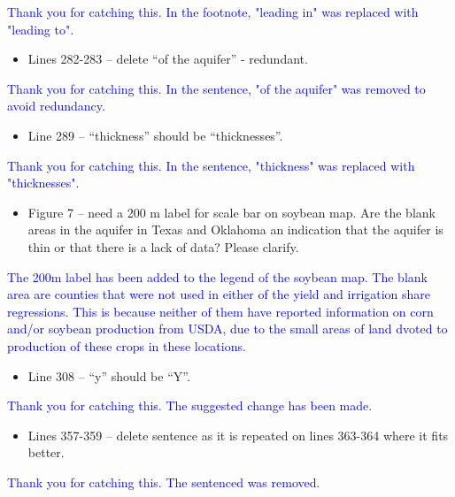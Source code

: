\documentclass[
]{article}
\providecommand{\tightlist}{%
  \setlength{\itemsep}{0pt}\setlength{\parskip}{0pt}}
\begin{document}
\textcolor{blue}{Thank you for catching this. In the footnote, "leading in" was replaced with "leading to".}

\begin{itemize}
\tightlist
\item
  Lines 282-283 -- delete ``of the aquifer'' - redundant.
\end{itemize}

\textcolor{blue}{Thank you for catching this. In the sentence, "of the aquifer" was removed to avoid redundancy.}

\begin{itemize}
\tightlist
\item
  Line 289 -- ``thickness'' should be ``thicknesses''.
\end{itemize}

\textcolor{blue}{Thank you for catching this. In the sentence, "thickness" was replaced with "thicknesses".}

\begin{itemize}
\tightlist
\item
  Figure 7 -- need a 200 m label for scale bar on soybean map. Are the
  blank areas in the aquifer in Texas and Oklahoma an indication that
  the aquifer is thin or that there is a lack of data? Please clarify.
\end{itemize}

\textcolor{blue}{The 200m label has been added to the legend of the soybean map. The blank area are counties that were not used in either of the yield and irrigation share regressions. This is because neither of them have reported information on corn and/or soybean production from USDA, due to the small areas of land dvoted to production of these crops in these locations.
}

\begin{itemize}
\tightlist
\item
  Line 308 -- ``y'' should be ``Y''.
\end{itemize}

\textcolor{blue}{Thank you for catching this. The suggested change has been made.}

\begin{itemize}
\tightlist
\item
  Lines 357-359 -- delete sentence as it is repeated on lines 363-364
  where it fits better.
\end{itemize}

\textcolor{blue}{Thank you for catching this. The sentenced was removed.}
\end{document}
